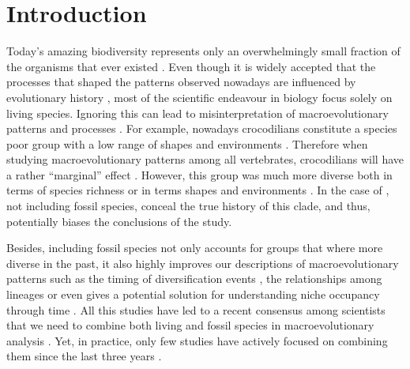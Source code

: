 \chapter{Introduction}
\label{chap:introduction}



%
% 

Today's amazing biodiversity represents only an overwhelmingly small fraction of the organisms that ever existed \citep{novacek1992ext,raup1993extinction}.
Even though it is widely accepted that the processes that shaped the patterns observed nowadays are influenced by evolutionary history \citep{fritzdiversity2013}, most of the scientific endeavour in biology focus solely on living species.
Ignoring this can lead to misinterpretation of macroevolutionary patterns and processes \citep{benton2015}.
For example, nowadays crocodilians constitute a species poor group \citep[25 species;][]{uetz2010original} with a low range of shapes and environments \citep[marine or freshwater;][]{Martin2008}.
Therefore when studying macroevolutionary patterns among all vertebrates, crocodilians will have a rather ``marginal'' effect \citep[e.g.][ suggests that terrestriality is a driver of diversification among living vertebrates]{Wiens2015}.
However, this group was much more diverse both in terms of species richness \citep[244 species reported in][]{Bronzati2015} or in terms shapes and environments \citep{stubbs2013}.
In the case of \cite{Wiens2015}, not including fossil species, conceal the true history of this clade, and thus, potentially biases the conclusions of the study.

Besides, including fossil species not only accounts for groups that where more diverse in the past, it also highly improves our descriptions of macroevolutionary patterns such as the timing of diversification events \citep[e.g. significantly reducing node age confidence intervals;][]{ronquista2012}, the relationships among lineages \citep[e.g. solving some controversial fossil placement;][]{Dembo2015} or even gives a potential solution for understanding niche occupancy through time \citep[e.g.][]{pearmanniche2008}.
All this studies have led to a recent consensus among scientists that we need to combine both living and fossil species in macroevolutionary analysis \citep{jacksonwhat2006,quentaldiversity2010,dietlconservation2011,slaterunifying2013,fritzdiversity2013,benton2015}.
Yet, in practice, only few studies have actively focused on combining them since the last three years \citep[e.g.][]{ronquista2012,slaterphylogenetic2013,Wood01032013,beckancient2014,Arcila2015131,Dembo2015}. %

